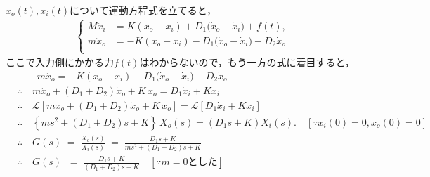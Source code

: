 \documentclass[a4paper,12pt]{article}
\begin{document}
\begin{tcolorbox}
    \({x}_o(t),{x}_i(t)\)について運動方程式を立てると，
    \begin{align*}
        \left\{
            \begin{aligned}
                M\ddot{x}_i &= K(x_o - x_i) + D_1\bigl(\dot{x}_o-\dot{x}_i\bigr)+ f(t),\\
                m\ddot{x}_o &= - K(x_o - x_i) - D_1\bigl(\dot{x}_o-\dot{x}_i\bigr) - D_2 \dot{x}_o\\
            \end{aligned}
        \right.
    \end{align*}
        ここで入力側にかかる力\(f(t)\)はわからないので，もう一方の式に着目すると，
    \begin{align*}
        &\qquad m\ddot{x}_o = - K(x_o - x_i) - D_1\bigl(\dot{x}_o-\dot{x}_i\bigr) - D_2 \dot{x}_o \\
        &\therefore \quad m\ddot{x}_o + (D_1 +D_2) \dot{x}_o + K\,x_o = D_1 \dot{x}_i + K x_i\\
        &\therefore \quad \mathcal{L} \left[  m\ddot{x}_o + (D_1 +D_2) \dot{x}_o + K\,x_o  \right] 
        =\mathcal{L} \left[ D_1 \dot{x}_i + K x_i \right] \\
        &\therefore \quad \left\{m s^2 + (D_1+D_2) s + K\right\}\,X_o(s) 
        = (D_1s+K)X_i(s). \quad [\because x_i(0)= 0, x_o(0)=0 ]\\
        &\therefore \quad G(s) \;=\;\frac{X_o(s)}{X_i(s)}
        \;=\;\frac{D_1s+K}{m s^2 + (D_1+D_2) s + K}\\
        &\therefore \quad G(s) \;
        \;=\;\frac{D_1s+K}{(D_1+D_2) s + K}\quad [\because m=0\text{とした}]\\
    \end{align*}

\end{tcolorbox}
\newpage
\end{document}

